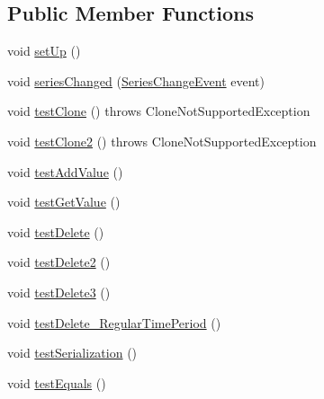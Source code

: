 \subsection*{Public Member Functions}
\begin{DoxyCompactItemize}
\item 
void \mbox{\hyperlink{classorg_1_1jfree_1_1data_1_1time_1_1_time_series_test_a6919a3389a0e412bf074ced9c32a2a58}{set\+Up}} ()
\item 
void \mbox{\hyperlink{classorg_1_1jfree_1_1data_1_1time_1_1_time_series_test_a57d6e460a96c8212fed888ae1f2d22cd}{series\+Changed}} (\mbox{\hyperlink{classorg_1_1jfree_1_1data_1_1general_1_1_series_change_event}{Series\+Change\+Event}} event)
\item 
void \mbox{\hyperlink{classorg_1_1jfree_1_1data_1_1time_1_1_time_series_test_a7abb21e080b091f4c2dce10cec109ee1}{test\+Clone}} ()  throws Clone\+Not\+Supported\+Exception 
\item 
void \mbox{\hyperlink{classorg_1_1jfree_1_1data_1_1time_1_1_time_series_test_a684b9e4fab228f05aeb71dc68dc85834}{test\+Clone2}} ()  throws Clone\+Not\+Supported\+Exception 
\item 
void \mbox{\hyperlink{classorg_1_1jfree_1_1data_1_1time_1_1_time_series_test_a37db518b52dbcdbd6296d4e680011e28}{test\+Add\+Value}} ()
\item 
void \mbox{\hyperlink{classorg_1_1jfree_1_1data_1_1time_1_1_time_series_test_a998e19f09ed65730547afa907e40af5d}{test\+Get\+Value}} ()
\item 
void \mbox{\hyperlink{classorg_1_1jfree_1_1data_1_1time_1_1_time_series_test_a578ed5b022d66b95cf33ec66c5b080aa}{test\+Delete}} ()
\item 
void \mbox{\hyperlink{classorg_1_1jfree_1_1data_1_1time_1_1_time_series_test_a7a273c2b441b5bd965c470f541a582c3}{test\+Delete2}} ()
\item 
void \mbox{\hyperlink{classorg_1_1jfree_1_1data_1_1time_1_1_time_series_test_a078da9e7674654ed649f0a29f818982a}{test\+Delete3}} ()
\item 
void \mbox{\hyperlink{classorg_1_1jfree_1_1data_1_1time_1_1_time_series_test_a7ee219e976a1763ea2d2b427ded3f3e4}{test\+Delete\+\_\+\+Regular\+Time\+Period}} ()
\item 
void \mbox{\hyperlink{classorg_1_1jfree_1_1data_1_1time_1_1_time_series_test_ab336cbca1abb0f060997a5b04cc3d12a}{test\+Serialization}} ()
\item 
void \mbox{\hyperlink{classorg_1_1jfree_1_1data_1_1time_1_1_time_series_test_a1295563c4a1d7f016d67eed5784b9e18}{test\+Equals}} ()

\end{DoxyCompactItemize}
